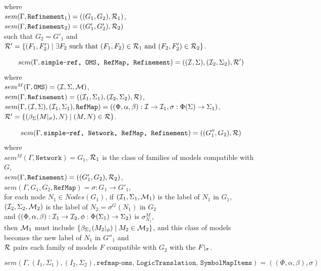 \documentclass[10pt,fleqn,%
\ifpretendfinal
final%
\else
draft%
\fi,
]{scrreprt}
\newcommand*{\syntax}[1]{\texttt{#1}}
\newcommand{\semdom}[1]{
\begin{center}
\fbox{$#1$}
\end{center}
}
\begin{document}
where\\ 
$sem(\Gamma, \syntax{Refinement}_1) = ((G_1, G_2), \cR_1)$,\\
$sem(\Gamma, \syntax{Refinement}_2) = ((G'_1,G'_2),\cR_2)$\\
such that 
$G_2 = G'_1$ and
${\cal R}' = \{(F_1,F'_2) \mid \exists F_2 \text{ such that } (F_1,F_2) \in {\cal R}_1 \text{ and } (F_2,F'_2) \in {\cal R}_2\}$.

$$sem(\Gamma, \syntax{simple-ref, OMS, RefMap, Refinement}) = ((\cI,\Sigma),(\cI_2,\Sigma_2),\cR')$$
where\\
 $sem^M(\Gamma,  \syntax{OMS}) = (\cI,\Sigma, \cM)$,\\
 $sem(\Gamma,  \syntax{Refinement}) = ((\cI_1,\Sigma_1),(\cI_2,\Sigma_2),\cR)$,\\ 
 $sem(\Gamma,  (\cI,\Sigma), (\cI_1,\Sigma_1), \syntax{RefMap}) = ((\Phi, \alpha,\beta):\cI\to\cI_1, \sigma:\Phi(\Sigma)\to\Sigma_1)$,\\
 ${\cal R}' = \{ (\beta_{\Sigma}(M|_{\sigma}), N) \mid (M,N) \in {\cal R} \}$.

$$sem(\Gamma, \syntax{simple-ref, Network, RefMap, Refinement}) = ((G''_1,G_2),\cR)$$
where\\
 $sem^M(\Gamma,  \syntax{Network}) = G_1$, ${\cal R}_1$ is the class of families of models compatible with $G$,\\
 $sem(\Gamma,  \syntax{Refinement}) = ((G'_1, G_2),\cR_2)$,\\ 
 $sem(\Gamma, G_1, G_2, \syntax{RefMap}) = \sigma:G_1\to G'_1$,\\
 for each node $N_1\in Nodes(G_1)$, 
if $({\cal I}_1, \Sigma_1, {\cal M}_1)$ is the label of $N_1$ in $G_1$,\\
$({\cal I}_2, \Sigma_2, {\cal M}_2)$ is the label of $N_2 = \sigma^G(N_1)$ in $G_2$ \\
and $((\Phi,\alpha,\beta):{\cal I}_1\to{\cal I}_2,\phi:\Phi(\Sigma_1)\to\Sigma_2)$ is $\sigma^M_{N_1}$,\\
then ${\cal M}_1$ must include $\{ \beta_{\Sigma_1}(M_2|_{\phi})  \mid M_2 \in {\cal M}_2\}$,
and this class of models becomes the new label of $N_1$ in $G''_1$ and\\
${\cal R}$ pairs each family of models $F$ compatible with $G_2$ with
the $F|_{\sigma}$.



\semdom{sem(\Gamma, (I_1,\Sigma_1), (I_2,\Sigma_2), \syntax{RefMap}) = (\rho, \sigma)}

$$sem(\Gamma, (I_1,\Sigma_1), (I_2,\Sigma_2), \syntax{refmap-oms, LogicTranslation, SymbolMapItems}) = ((\Phi,\alpha,\beta), \sigma) $$
\end{document}
